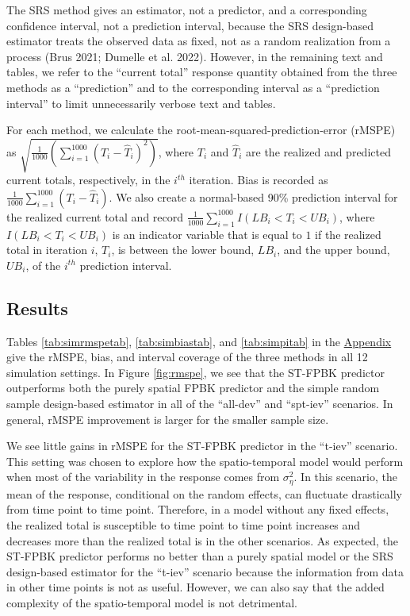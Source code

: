 \documentclass[]{article}    %
\begin{document}
The SRS method gives an estimator, not a predictor, and a corresponding
confidence interval, not a prediction interval, because the SRS
design-based estimator treats the observed data as fixed, not as a
random realization from a process (Brus 2021; Dumelle et al. 2022).
However, in the remaining text and tables, we refer to the ``current
total'' response quantity obtained from the three methods as a
``prediction'' and to the corresponding interval as a ``prediction
interval'' to limit unnecessarily verbose text and tables.

For each method, we calculate the root-mean-squared-prediction-error
(rMSPE) as
\(\sqrt{\frac{1}{1000}(\sum_{i = 1}^{1000}(T_i - \hat{T}_i)^2)}\), where
\(T_i\) and \(\hat{T}_i\) are the realized and predicted current totals,
respectively, in the \(i^{th}\) iteration. Bias is recorded as
\(\frac{1}{1000}\sum_{i = 1}^{1000}(T_i - \hat{T}_i)\). We also create a
normal-based 90\% prediction interval for the realized current total and
record \(\frac{1}{1000} \sum_{i = 1}^{1000}I(LB_i < T_i < UB_i)\), where
\(I(LB_i < T_i < UB_i)\) is an indicator variable that is equal to \(1\)
if the realized total in iteration \(i\), \(T_i\), is between the lower
bound, \(LB_i\), and the upper bound, \(UB_i\), of the \(i^{th}\)
prediction interval.

\hypertarget{results}{%
\subsection{Results}\label{results}}

Tables \ref{tab:simrmspetab}, \ref{tab:simbiastab}, and
\ref{tab:simpitab} in the \protect\hyperlink{appendix}{Appendix} give
the rMSPE, bias, and interval coverage of the three methods in all 12
simulation settings. In Figure \ref{fig:rmspe}, we see that the ST-FPBK
predictor outperforms both the purely spatial FPBK predictor and the
simple random sample design-based estimator in all of the ``all-dev''
and ``spt-iev'' scenarios. In general, rMSPE improvement is larger for
the smaller sample size.

We see little gains in rMSPE for the ST-FPBK predictor in the ``t-iev''
scenario. This setting was chosen to explore how the spatio-temporal
model would perform when most of the variability in the response comes
from \(\sigma^2_{\eta}\). In this scenario, the mean of the response,
conditional on the random effects, can fluctuate drastically from time
point to time point. Therefore, in a model without any fixed effects,
the realized total is susceptible to time point to time point increases
and decreases more than the realized total is in the other scenarios. As
expected, the ST-FPBK predictor performs no better than a purely spatial
model or the SRS design-based estimator for the ``t-iev'' scenario
because the information from data in other time points is not as useful.
However, we can also say that the added complexity of the
spatio-temporal model is not detrimental.
\end{document}
